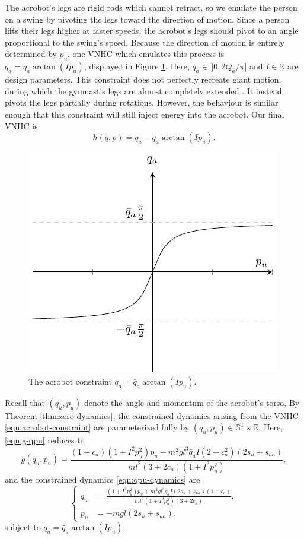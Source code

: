 \documentclass[journal,twoside,web]{ieeecolor}
\newcommand*{\R}{\mathbb{R}}
\newcommand*{\Sone}{\mathbb{S}^1}
\newcommand*{\SxR}{\Sone \times \R}
\begin{document}
{The acrobot's legs are rigid rods which cannot retract, so we emulate the person
on a swing by pivoting the legs toward the direction of motion. 
Since a person lifts their legs higher at faster speeds, the acrobot's legs should
pivot to an angle proportional to the swing's speed.
Because the direction of motion is entirely determined by \(p_u\), 
one VNHC which emulates this process is \(q_a = \bar{q}_a\arctan( I p_u)\),
displayed in Figure \ref{fig:qa-arctan}.
Here, \(\bar{q}_a \in \, ]0,2 Q_a/\pi]\) and \(I \in \R\) are 
design parameters.
This constraint does not perfectly recreate giant motion, during which
the gymnast's legs are almost completely extended \cite{usagym_giant}.
It instead pivots the legs partially during rotations.
However, the behaviour is similar enough that this constraint will
still inject energy into the acrobot.
Our final VNHC is
\begin{equation}\label{eqn:acrobot-constraint}
    h(q,p) = q_a - \bar{q}_a \arctan(I p_u)
    .
\end{equation}

\begin{figure}
    \centering
    \includegraphics[width=0.7\linewidth]{qa_arctan.pdf}
    \caption{The acrobot constraint \(q_a = \bar{q}_a \arctan(I p_u)\).}
    \label{fig:qa-arctan}
\end{figure}

Recall that \((q_u, p_u)\) denote the angle and momentum of the acrobot's torso.
By Theorem \ref{thm:zero-dynamics}, the constrained dynamics arising from the
VNHC \eqref{eqn:acrobot-constraint} are parameterized fully by 
\((q_u,p_u) \in \SxR\).
Here, \eqref{eqn:g-qpu} reduces to
\begin{equation*}
    g(q_u,p_u) = \frac{
        (1+c_a)(1+I^2 p_u^2)p_u - m^2gl^3\bar{q}_a I (2-c_a^2)(2s_u + s_{ua})
    }{ml^2(3+2c_a)(1+I^2 p_u^2)}
    ,
\end{equation*}
and the constrained dynamics \eqref{eqn:qpu-dynamics} are
\begin{equation}\label{eqn:acrobot-constrained-dynamics}
    \begin{cases}
    \dot{q}_u &= \frac{(1+I^2 p_u^2)p_u + m^2gl^3\bar{q}_a I(2s_u + s_{ua})(1+c_a) }
            {ml^2(1+I^2 p_u^2)(3+2c_a)}
    ,    \\
    \dot{p}_u &= - m g l (2s_u + s_{ua})
    ,
    \end{cases}
\end{equation}
subject to \(q_a = \bar{q}_a \arctan(I p_u)\).

}
\end{document}

